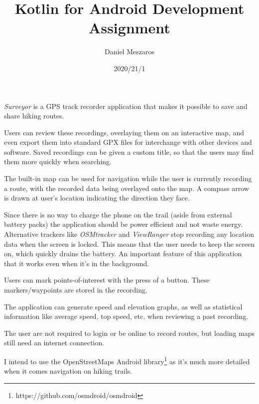 \documentclass{article}
\begin{document}
\title{Kotlin for Android Development Assignment}
\author{Daniel Meszaros}
\date{2020/21/1}

\emph{Surveyor} is a GPS track recorder application that makes it
possible to save and share hiking routes.

Users can review these recordings, overlaying them on an interactive map,
and even export them into standard GPX files for interchange with other devices
and software.
Saved recordings can be given a custom title, so that the users may find them
more quickly when searching.

The built-in map can be used for navigation while the user is currently
recording a route, with the recorded data being overlayed onto the map.
A compass arrow is drawn at user's location indicating the direction they face.

Since there is no way to charge the phone on the trail (aside from external
battery packs) the application should be power efficient and not waste energy.
Alternative trackers like \emph{OSMtracker} and \emph{ViewRanger} stop recording
any location data when the screen is locked.
This means that the user needs to keep the screen on, which quickly drains the
battery.
An important feature of this application that it works even when it's in the
background.

Users can mark points-of-interest with the press of a button. These
markers/waypoints are stored in the recording.

The application can generate speed and elevation graphs, as well as statistical
information like average speed, top speed, etc. when reviewing a past recording.

The user are not required to login or be online to record routes, but loading
maps still need an internet connection.

I intend to use the OpenStreetMaps Android
library\footnote{https://github.com/osmdroid/osmdroid} as it's much more
detailed when it comes navigation on hiking trails.
\end{document}
